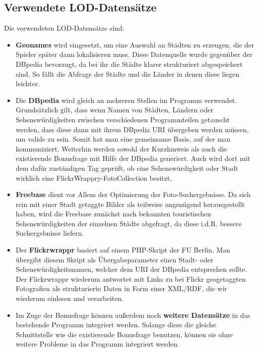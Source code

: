 \documentclass[a4paper, 11pt]{article}
\begin{document}
\subsection{Verwendete LOD-Datensätze}
Die verwendeten LOD-Datensätze sind:
\begin{itemize}
\item \textbf{Geonames} wird eingesetzt, um eine Auswahl an Städten zu erzeugen, die der Spieler später dann lokalisieren muss. Diese Datenquelle wurde gegenüber der DBpedia bevorzugt, da bei ihr die Städte klarer strukturiert abgespeichert sind. So fällt die Abfrage der Städte und die Länder in denen diese liegen leichter.
\item Die \textbf{DBpedia} wird gleich an mehreren Stellen im Programm verwendet. Grundsätzlich gilt, dass wenn Namen von Städten, Ländern oder Sehenswürdigkeiten zwischen verschiedenen Programmteilen getauscht werden, dass diese dann mit ihrem DBpedia URI übergeben werden müssen, um valide zu sein. Somit hat man eine gemeinsame Basis, auf der man kommuniziert. Weiterhin werden sowohl der Kurzhinweis als auch die existierende Bonusfrage mit Hilfe der DBpedia generiert. Auch wird dort mit dem dafür zuständigen Tag geprüft, ob eine Sehenswürdigkeit oder Stadt wirklich eine FlickrWrappry-FotoCollection besitzt.
\item \textbf{Freebase} dient vor Allem der Optimierung der Foto-Suchergebnisse. Da sich rein mit einer Stadt getaggte Bilder als teilweise ungenügend herausgestellt haben, wird die Freebase zunächst nach bekannten touristischen Sehenswürdigkeiten der einzelnen Städte abgefragt, da diese i.d.R. bessere Suchergebnisse liefern.
\item Der \textbf{Flickrwrappr} basiert auf einem PHP-Skript der FU Berlin. Man übergibt diesem Skript als Übergabeparameter einen Stadt- oder Sehenswürdigkeitsnamen, welcher dem URI der DBpedia entsprechen sollte. Der Flickrwrappr wiederum antwortet mit Links zu bei Flickr geogetaggten Fotografien als strukturierte Daten in Form einer XML/RDF, die wir wiederum einlesen und verarbeiten.
\item Im Zuge der Bonusfrage können außerdem noch \textbf{weitere Datensätze} in das bestehende Programm integriert werden. Solange diese die gleiche Schnittstelle wie die existierende Bonusfrage benutzen, können sie ohne weitere Probleme in das Programm integriert werden.
\end{itemize}
\end{document}
